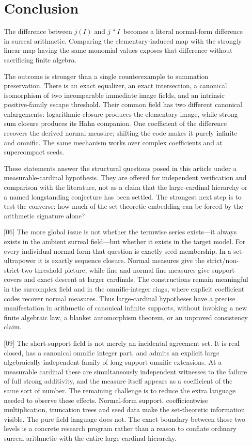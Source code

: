 \documentclass[11pt,letterpaper]{article}
\numberwithin{equation}{section}
\theoremstyle{definition}
\theoremstyle{remark}
\newcommand{\imset}[2]{#1\mathbin{``}#2}
\newcommand{\src}[1]{\textup{\textsf{\small[#1]}}}%
\begin{document}
\section{Conclusion}
The difference between $j(I)$ and $\imset jI$ becomes a literal normal-form
difference in surreal arithmetic. Comparing the elementary-induced map
with the strongly linear map having the same monomial values exposes that
difference without sacrificing finite algebra.

The outcome is stronger than a single counterexample to summation
preservation. There is an exact equalizer, an exact intersection, a
canonical isomorphism of two incomparable immediate image fields, and an
intrinsic positive-family escape threshold. Their common field has two
different canonical enlargements: logarithmic closure produces the
elementary image, while strong-sum closure produces its Hahn companion.
One coefficient of the difference recovers the derived normal measure;
shifting the code makes it purely infinite and omnific. The same mechanism
works over complex coefficients and at supercompact seeds.

These statements answer the structural questions posed in this article
under a measurable-cardinal hypothesis. They are offered for independent
verification and comparison with the literature, not as a claim that the
large-cardinal hierarchy or a named longstanding conjecture has been
settled. The strongest next step is to test the converse: how much of the
set-theoretic embedding can be forced by the arithmetic signature alone?

\src{06} The more global issue is not whether the termwise series
exists---it always exists in the ambient surreal field---but whether it
exists in the target model. For every individual normal form that question
is exactly seed membership. In a set-ultrapower it is exactly sequence
closure. Normal measures give the strict/non-strict two-threshold picture,
while fine and normal fine measures give support covers and exact descent
at larger cardinals. The constructions remain meaningful in the surcomplex
field and in the omnific-integer rings, where explicit coefficient codes
recover normal measures. Thus large-cardinal hypotheses have a precise
manifestation in arithmetic of canonical infinite supports, without invoking
a new finite algebraic law, a blanket automorphism theorem, or an unproved
consistency claim.

\src{09} The short-support field is not merely an incidental agreement set.
It is real closed, has a canonical omnific integer part, and admits an
explicit large algebraically independent family of long-support omnific
extensions. At a measurable cardinal these are simultaneously independent
witnesses to the failure of full strong additivity, and the measure itself
appears as a coefficient of the same sort of number. The remaining
challenge is to reduce the extra language needed to observe these effects.
Normal-form support, coefficientwise multiplication, truncation trees and
seed data make the set-theoretic information visible. The pure field
language does not. The exact boundary between those two levels is a
concrete research program rather than a reason to conflate ordinary surreal
arithmetic with the entire large-cardinal hierarchy.
\end{document}
